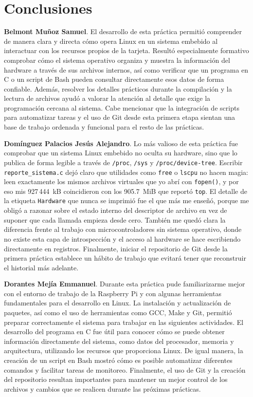 \documentclass[conference]{IEEEtran}
\begin{document}
\section{Conclusiones}

\textbf{Belmont Muñoz Samuel}. El desarrollo de esta práctica permitió comprender de manera clara y directa cómo opera Linux en un sistema embebido al interactuar con los recursos propios de la tarjeta. Resultó especialmente formativo comprobar cómo el sistema operativo organiza y muestra la información del hardware a través de sus archivos internos, así como verificar que un programa en C o un script de Bash pueden consultar directamente esos datos de forma confiable. Además, resolver los detalles prácticos durante la compilación y la lectura de archivos ayudó a valorar la atención al detalle que exige la programación cercana al sistema. Cabe mencionar que la integración de scripts para automatizar tareas y el uso de Git desde esta primera etapa sientan una base de trabajo ordenada y funcional para el resto de las prácticas.

\textbf{Domínguez Palacios Jesús Alejandro}. Lo más valioso de esta práctica fue comprobar que un sistema Linux embebido no oculta su hardware, sino que lo publica de forma legible a través de \texttt{/proc}, \texttt{/sys} y \texttt{/proc/device-tree}. Escribir \texttt{reporte\_sistema.c} dejó claro que utilidades como \texttt{free} o \texttt{lscpu} no hacen magia: leen exactamente los mismos archivos virtuales que yo abrí con \texttt{fopen()}, y por eso mis 927\,444~kB coincidieron con los 905.7~MiB que reportó \texttt{top}. El detalle de la etiqueta \texttt{Hardware} que nunca se imprimió fue el que más me enseñó, porque me obligó a razonar sobre el estado interno del descriptor de archivo en vez de suponer que cada llamada empieza desde cero. También me quedó clara la diferencia frente al trabajo con microcontroladores sin sistema operativo, donde no existe esta capa de introspección y el acceso al hardware se hace escribiendo directamente en registros. Finalmente, iniciar el repositorio de Git desde la primera práctica establece un hábito de trabajo que evitará tener que reconstruir el historial más adelante.

\textbf{Dorantes Mejía Emmanuel}. Durante esta práctica pude familiarizarme mejor con el entorno de trabajo de la Raspberry Pi y con algunas herramientas fundamentales para el desarrollo en Linux. La instalación y actualización de paquetes, así como el uso de herramientas como GCC, Make y Git, permitió preparar correctamente el sistema para trabajar en las siguientes actividades. El desarrollo del programa en C fue útil para conocer cómo se puede obtener información directamente del sistema, como datos del procesador, memoria y arquitectura, utilizando los recursos que proporciona Linux. De igual manera, la creación de un script en Bash mostró cómo es posible automatizar diferentes comandos y facilitar tareas de monitoreo. Finalmente, el uso de Git y la creación del repositorio resultan importantes para mantener un mejor control de los archivos y cambios que se realicen durante las próximas prácticas.
\end{document}
